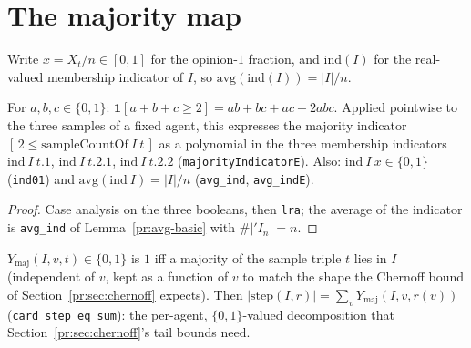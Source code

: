 \section{The majority map}\label{mj:sec:map}

Write $x = X_t/n \in [0,1]$ for the opinion-$1$ fraction, and
$\mathrm{ind}(I)$ for the real-valued membership indicator of $I$, so
$\mathrm{avg}(\mathrm{ind}(I)) = |I|/n$.

\begin{lemma}\label{mj:majpoly}
  \rocqok
  For $a,b,c \in \{0,1\}$: $\mathbf 1[a+b+c\ge2] = ab+bc+ac-2abc$. Applied
  pointwise to the three samples of a fixed agent, this expresses the
  majority indicator $[\,2 \le \mathrm{sampleCountOf}\ I\ t\,]$ as a
  polynomial in the three membership indicators
  $\mathrm{ind}\ I\ t.1$, $\mathrm{ind}\ I\ t.2.1$, $\mathrm{ind}\ I\ t.2.2$
  (\texttt{majorityIndicatorE}). Also: $\mathrm{ind}\ I\ x \in \{0,1\}$
  (\texttt{ind01}) and $\mathrm{avg}(\mathrm{ind}\ I) = |I|/n$
  (\texttt{avg\_ind}, \texttt{avg\_indE}).
\end{lemma}
\begin{proof}
  \rocqok
  Case analysis on the three booleans, then \texttt{lra}; the average of
  the indicator is \texttt{avg\_ind} of Lemma~\ref{pr:avg-basic} with
  $\#|'I_n| = n$.
\end{proof}

\begin{definition}\label{mj:Ymaj}
  \rocqok
  $Y_{\mathrm{maj}}(I,v,t) \in \{0,1\}$ is $1$ iff a majority of the sample
  triple $t$ lies in $I$ (independent of $v$, kept as a function of $v$ to
  match the shape the Chernoff bound of Section~\ref{pr:sec:chernoff}
  expects). Then $|\mathrm{step}(I,r)| = \sum_v Y_{\mathrm{maj}}(I,v,r(v))$
  (\texttt{card\_step\_eq\_sum}): the per-agent, $\{0,1\}$-valued
  decomposition that Section~\ref{pr:sec:chernoff}'s tail bounds need.
\end{definition}

